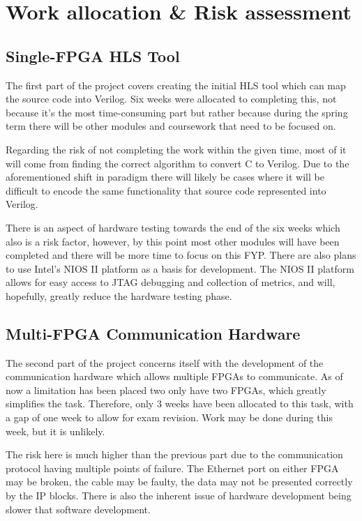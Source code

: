 \section{Work allocation \& Risk assessment}
\subsection{Single-FPGA HLS Tool}

The first part of the project covers creating the initial HLS tool which can map the source code into Verilog. Six weeks were allocated to completing this, not because it's the most time-consuming part but rather because during the spring term there will be other modules and coursework that need to be focused on.

Regarding the risk of not completing the work within the given time, most of it will come from finding the correct algorithm to convert C to Verilog. Due to the aforementioned shift in paradigm there will likely be cases where it will be difficult to encode the same functionality that source code represented into Verilog.

There is an aspect of hardware testing towards the end of the six weeks which also is a risk factor, however, by this point most other modules will have been completed and there will be more time to focus on this FYP. There are also plans to use Intel's NIOS II platform as a basis for development. The NIOS II platform allows for easy access to JTAG debugging and  collection of metrics, and will, hopefully, greatly reduce the hardware testing phase.

\subsection{Multi-FPGA Communication Hardware}

The second part of the project concerns itself with the development of the communication hardware which allows multiple FPGAs to communicate. As of now a limitation has been placed two only have two FPGAs, which greatly simplifies the task. Therefore, only 3 weeks have been allocated to this task, with a gap of one week to allow for exam revision. Work may be done during this week, but it is unlikely.

The risk here is much higher than the previous part due to the communication protocol having multiple points of failure. The Ethernet port on either FPGA may be broken, the cable may be faulty, the data may not be presented correctly by the IP blocks. There is also the inherent issue of hardware development being slower that software development. 

